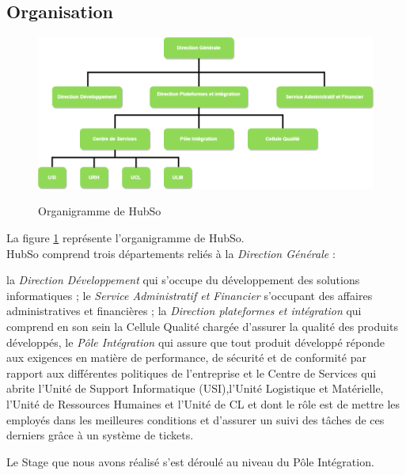 \subsection{Organisation}
\begin{figure}[h!]
	\centering
	\begin{minipage}{18cm}
		\centering
		{\includegraphics[height=0.27\textheight]{fig/Organnigramme-HubSo.png}}
	\end{minipage}
 	\caption{Organigramme de HubSo}
 	\label{fig:1.1}
\end{figure}
La figure \ref{fig:1.1} représente l'organigramme de HubSo. \\
HubSo comprend trois départements reliés à la \emph{Direction Générale} : 
\begin{itemize}
	\itemcheck la \emph{Direction Développement} qui s'occupe du développement des solutions informatiques ; 
	\itemcheck le \emph{Service Administratif et Financier} s'occupant des affaires administratives et financières ;
	\itemcheck la \emph{Direction plateformes et intégration} qui comprend en son sein la Cellule Qualité chargée d'assurer la qualité des produits développés, le \textsl{Pôle Intégration} qui assure que tout produit développé réponde aux exigences en matière de performance, de sécurité et de conformité par rapport aux différentes politiques de l'entreprise et le Centre de Services qui abrite l'Unité de Support Informatique (USI),l'Unité Logistique et Matérielle, l'Unité de Ressources Humaines et l'Unité de CL et dont le rôle est de mettre les employés dans les meilleures conditions et d'assurer un suivi des tâches de ces derniers grâce à un système de tickets.
\end{itemize}
Le Stage que nous avons réalisé s'est déroulé au niveau du Pôle Intégration.